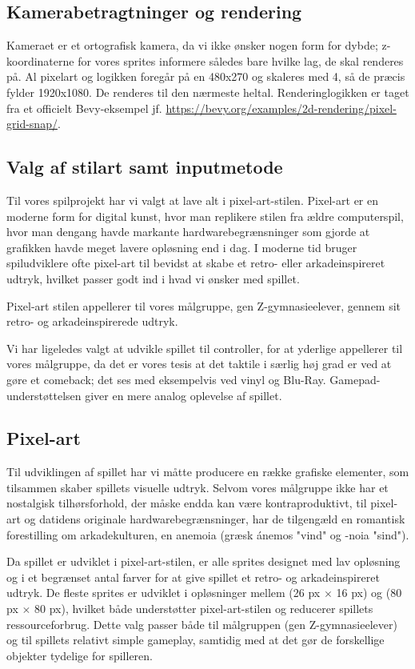 \subsection{Kamerabetragtninger og rendering}
Kameraet er et ortografisk kamera, da vi ikke ønsker nogen form for dybde; z-koordinaterne for vores sprites informere således bare hvilke lag, de skal renderes på. Al pixelart og logikken foregår på en 480x270 og skaleres med 4, så de præcis fylder 1920x1080. De renderes til den nærmeste heltal. Renderinglogikken er taget fra et officielt Bevy-eksempel jf. \url{https://bevy.org/examples/2d-rendering/pixel-grid-snap/}.

\subsection{Valg af stilart samt inputmetode}
Til vores spilprojekt har vi valgt at lave alt i pixel-art-stilen. Pixel-art er en moderne form for digital kunst, hvor man replikere stilen fra ældre computerspil, hvor man dengang havde markante hardwarebegrænsninger som gjorde at grafikken havde meget lavere opløsning end i dag. I moderne tid bruger spiludviklere ofte pixel-art til bevidst at skabe et retro- eller arkadeinspireret udtryk, hvilket passer godt ind i hvad vi ønsker med spillet.

Pixel-art stilen appellerer til vores målgruppe, gen Z-gymnasieelever, gennem sit retro- og arkadeinspirerede udtryk.

Vi har ligeledes valgt at udvikle spillet til controller, for at yderlige appellerer til vores målgruppe, da det er vores tesis at det taktile i særlig høj grad er ved at gøre et comeback; det ses med eksempelvis ved vinyl og Blu-Ray. Gamepad-understøttelsen giver en mere analog oplevelse af spillet.

\subsection{Pixel-art}

Til udviklingen af spillet har vi måtte producere en række grafiske elementer, som tilsammen skaber spillets visuelle udtryk. Selvom vores målgruppe ikke har et nostalgisk tilhørsforhold, der måske endda kan være kontraproduktivt, til pixel-art og datidens originale hardwarebegrænsninger, har de tilgengæld en romantisk forestilling om arkadekulturen, en anemoia (græsk ánemos "vind" og -noia "sind").

Da spillet er udviklet i pixel-art-stilen, er alle sprites designet med lav opløsning og i et begrænset antal farver for at give spillet et retro- og arkadeinspireret udtryk. De fleste sprites er udviklet i opløsninger mellem (26 px $\times$ 16 px) og (80 px $\times$ 80 px), hvilket både understøtter pixel-art-stilen og reducerer spillets ressourceforbrug. Dette valg passer både til målgruppen (gen Z-gymnasieelever) og til spillets relativt simple gameplay, samtidig med at det gør de forskellige objekter tydelige for spilleren.

